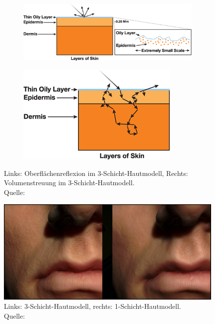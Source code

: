 \documentclass[ngerman,runningheads,a4paper]{llncs}[2018/03/10]
\begin{document}
\begin{figure}
  \centering
  \begin{subfigure}{.5\textwidth}
    \centering
    \includegraphics[scale=0.5,keepaspectratio]{./images/multilayer-skin-specular-reflection.jpg}
    \label{fig:multilayer-specular}
  \end{subfigure}%
  \begin{subfigure}{.5\textwidth}
    \centering
    \includegraphics[scale=0.5,keepaspectratio]{./images/multilayer-skin-subsurface.jpg}
    \label{fig:multilayer-subsurface}
  \end{subfigure}
  \caption{Links: Oberflächenreflexion im 3-Schicht-Hautmodell, Rechts: Volumenstreuung im 3-Schicht-Hautmodell.\\\hspace{\textwidth}Quelle: \citet{efficient-human-skin-rendering}}
\end{figure}

\begin{figure}
  \centering
  \includegraphics[scale=0.25,keepaspectratio]{./images/importance-of-layer-amount}
    \caption{Links: 3-Schicht-Hautmodell, rechts: 1-Schicht-Hautmodell.\\\hspace{\textwidth}Quelle: \citet{efficient-human-skin-rendering}}
\end{figure}
\end{document}
